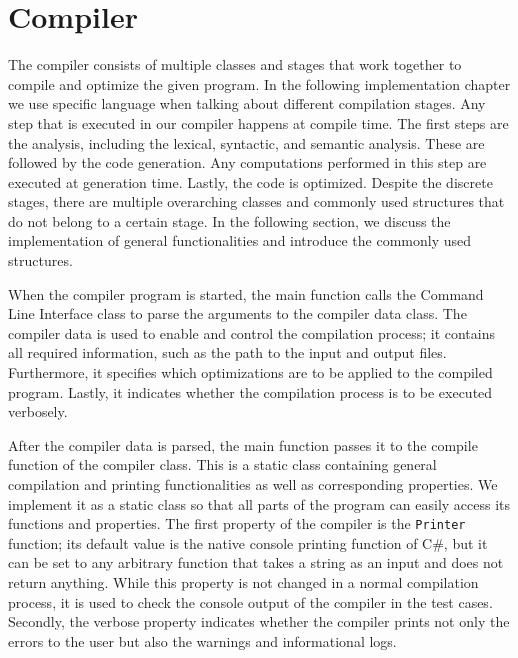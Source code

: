 \section{Compiler}
\label{sec:implementation_compiler}
The compiler consists of multiple classes and stages that work together to compile and optimize the given program. In the following implementation chapter we use specific language when talking about different compilation stages. Any step that is executed in our compiler happens at compile time. The first steps are the analysis, including the lexical, syntactic, and semantic analysis. These are followed by the code generation. Any computations performed in this step are executed at generation time. Lastly, the code is optimized. 
Despite the discrete stages, there are multiple overarching classes and commonly used structures that do not belong to a certain stage. In the following section, we discuss the implementation of general functionalities and introduce the commonly used structures.

When the compiler program is started, the main function calls the Command Line Interface class to parse the arguments to the compiler data class. The compiler data is used to enable and control the compilation process; it contains all required information, such as the path to the input and output files. Furthermore, it specifies which optimizations are to be applied to the compiled program. Lastly, it indicates whether the compilation process is to be executed verbosely. 

After the compiler data is parsed, the main function passes it to the compile function of the compiler class. This is a static class containing general compilation and printing functionalities as well as corresponding properties. We implement it as a static class so that all parts of the program can easily access its functions and properties. The first property of the compiler is the \texttt{Printer} function; its default value is the native console printing function of C\#, but it can be set to any arbitrary function that takes a string as an input and does not return anything. While this property is not changed in a normal compilation process, it is used to check the console output of the compiler in the test cases. Secondly, the verbose property indicates whether the compiler prints not only the errors to the user but also the warnings and informational logs.

